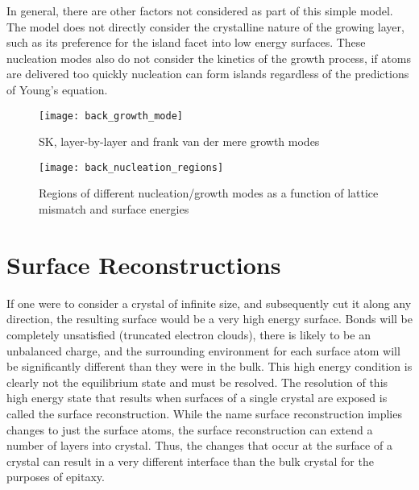  In general, there are other factors not considered as part of this simple model. The model does not directly consider the crystalline nature of the growing layer, such as its preference for the island facet into low energy surfaces. These nucleation modes also do not consider the kinetics of the growth process, if atoms are delivered too quickly nucleation can form islands regardless of the predictions of Young's equation.
\begin{figure}
    \centering
    \texttt{[image: back\_growth\_mode]}
    \caption{\label{fig:back_growth_mode}SK, layer-by-layer and frank van der mere growth modes\cite{ohring2001materials}}
\end{figure}

\begin{figure}
    \centering
    \texttt{[image: back\_nucleation\_regions]}
    \caption{\label{fig:back_nucleation_regions}Regions of different nucleation/growth modes as a function of lattice mismatch and surface energies\cite{ohring2001materials}}
\end{figure}

\section{Surface Reconstructions}\label{sec:reconstruction}
If one were to consider a crystal of infinite size, and subsequently cut it along any direction, the resulting surface would be a very high energy surface. Bonds will be completely unsatisfied (truncated electron clouds), there is likely to be an unbalanced charge, and the surrounding environment for each surface atom will be significantly different than they were in the bulk. This high energy condition is clearly not the equilibrium state and must be resolved. The resolution of this high energy state that results when surfaces of a single crystal are exposed is called the surface reconstruction. While the name surface reconstruction implies changes to just the surface atoms, the surface reconstruction can extend a number of layers into crystal. Thus, the changes that occur at the surface of a crystal can result in a very different interface than the bulk crystal for the purposes of epitaxy.

